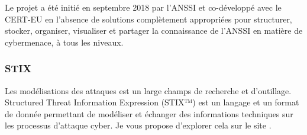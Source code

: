 Le projet  a été initié en septembre 2018 par l’ANSSI et co-développé avec le CERT-EU en l’absence de solutions complètement appropriées pour structurer, stocker, organiser, visualiser et partager la connaissance de l’ANSSI en matière de cybermenace, à tous les niveaux.





\subsubsection{STIX}


Les modélisations des attaques est un large champs de recherche et d'outillage.
Structured Threat Information Expression (STIX™) est un langage et un format de donnée permettant de modéliser et échanger des informations techniques sur les processus d'attaque cyber. 
Je vous propose d'explorer cela sur le site .

